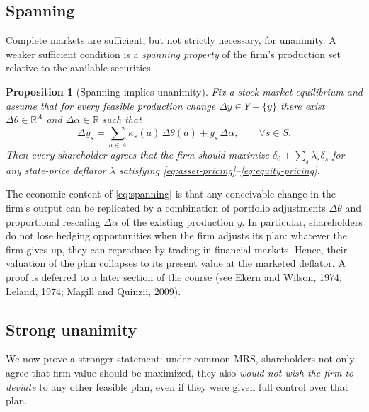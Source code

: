 \documentclass[11pt,a4paper]{article}
\def\R{\mathbb{R}}
\theoremstyle{plain}
\newtheorem{proposition}[theorem]{Proposition}
\theoremstyle{definition}
\theoremstyle{remark}
\begin{document}
\subsection{Spanning}

Complete markets are sufficient, but not strictly necessary, for unanimity. A weaker sufficient condition is a \emph{spanning property} of the firm's production set relative to the available securities.

\begin{proposition}[Spanning implies unanimity]\label{prop:spanning}
Fix a stock-market equilibrium and assume that for every feasible production change $\Delta y\in Y-\{y\}$ there exist $\Delta\theta\in\R^A$ and $\Delta\alpha\in\R$ such that
\begin{equation}\label{eq:spanning}
  \Delta y_s = \sum_{a\in A}\kappa_s(a)\,\Delta\theta(a) + y_s\,\Delta\alpha,
  \qquad \forall s\in S.
\end{equation}
Then every shareholder agrees that the firm should maximize $\delta_0 + \sum_s\lambda_s\delta_s$ for \emph{any} state-price deflator $\lambda$ satisfying \eqref{eq:asset-pricing}--\eqref{eq:equity-pricing}.
\end{proposition}

The economic content of \eqref{eq:spanning} is that any conceivable change in the firm's output can be replicated by a combination of portfolio adjustments $\Delta\theta$ and proportional rescaling $\Delta\alpha$ of the existing production $y$. In particular, shareholders do not lose hedging opportunities when the firm adjusts its plan: whatever the firm gives up, they can reproduce by trading in financial markets. Hence, their valuation of the plan collapses to its present value at the marketed deflator. A proof is deferred to a later section of the course (see Ekern and Wilson, 1974; Leland, 1974; Magill and Quinzii, 2009).

\subsection{Strong unanimity}

We now prove a stronger statement: under common MRS, shareholders not only agree that firm value should be maximized, they also \emph{would not wish the firm to deviate} to any other feasible plan, even if they were given full control over that plan.
\end{document}
